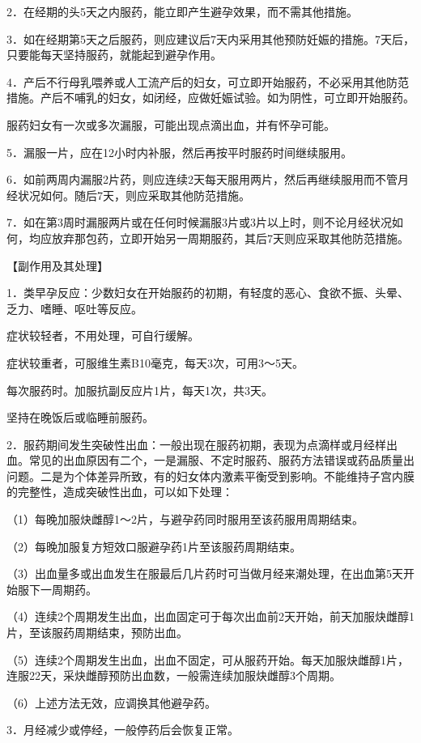 \documentclass[12pt,UTF8]{ctexbook}
\begin{document}
2．在经期的头5天之内服药，能立即产生避孕效果，而不需其他措施。

3．如在经期第5天之后服药，则应建议后7天内采用其他预防妊娠的措施。7天后，只要能每天坚持服药，就能起到避孕作用。

4．产后不行母乳喂养或人工流产后的妇女，可立即开始服药，不必采用其他防范措施。产后不哺乳的妇女，如闭经，应做妊娠试验。如为阴性，可立即开始服药。

服药妇女有一次或多次漏服，可能出现点滴出血，并有怀孕可能。

5．漏服一片，应在12小时内补服，然后再按平时服药时间继续服用。

6．如前两周内漏服2片药，则应连续2天每天服用两片，然后再继续服用而不管月经状况如何。随后7天，则应采取其他防范措施。

7．如在第3周时漏服两片或在任何时候漏服3片或3片以上时，则不论月经状况如何，均应放弃那包药，立即开始另一周期服药，其后7天则应采取其他防范措施。

【副作用及其处理】

1．类早孕反应：少数妇女在开始服药的初期，有轻度的恶心、食欲不振、头晕、乏力、嗜睡、呕吐等反应。

症状较轻者，不用处理，可自行缓解。

症状较重者，可服维生素B10毫克，每天3次，可用3～5天。

每次服药时。加服抗副反应片1片，每天1次，共3天。

坚持在晚饭后或临睡前服药。

2．服药期间发生突破性出血：一般出现在服药初期，表现为点滴样或月经样出血。常见的出血原因有二个，一是漏服、不定时服药、服药方法错误或药品质量出问题。二是为个体差异所致，有的妇女体内激素平衡受到影响。不能维持子宫内膜的完整性，造成突破性出血，可以如下处理：

（1）每晚加服炔雌醇1～2片，与避孕药同时服用至该药服用周期结束。

（2）每晚加服复方短效口服避孕药1片至该服药周期结束。

（3）出血量多或出血发生在服最后几片药时可当做月经来潮处理，在出血第5天开始服下一周期药。

（4）连续2个周期发生出血，出血固定可于每次出血前2天开始，前天加服炔雌醇1片，至该服药周期结束，预防出血。

（5）连续2个周期发生出血，出血不固定，可从服药开始。每天加服炔雌醇1片，连服22天，采炔雌醇预防出血数，一般需连续加服炔雌醇3个周期。

（6）上述方法无效，应调换其他避孕药。

3．月经减少或停经，一般停药后会恢复正常。
\end{document}
